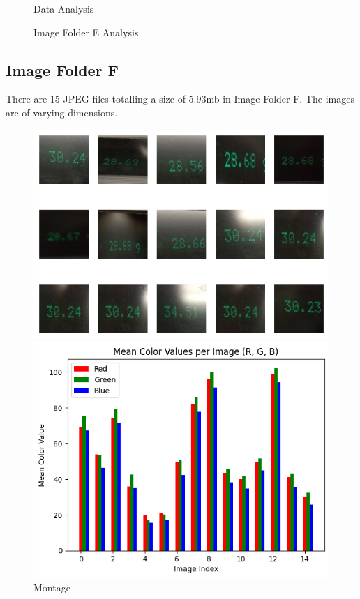 \begin{figure}[ht]
\begin{minipage}[t]{0.50\textwidth}
        \caption*{Data Analysis}
    \end{minipage}
    \caption{Image Folder E Analysis}
    \label{fig:Image Folder E Analysis}
\end{figure}

\subsection{Image Folder F}

There are 15 JPEG files totalling a size of 5.93mb in Image Folder F. The images are of varying dimensions.

\begin{figure}[ht]
    \centering
    \begin{minipage}[t]{0.25\textwidth}
        \centering
        \includegraphics[width=\textwidth]{Figures/EDA_Charts/8/montage.png}
        \caption*{Montage}
    \end{minipage}\hfill
    \begin{minipage}[t]{0.25\textwidth}
        \centering
        \includegraphics[width=\textwidth]{Figures/EDA_Charts/8/rgb.png}

\end{minipage}
\end{figure}
